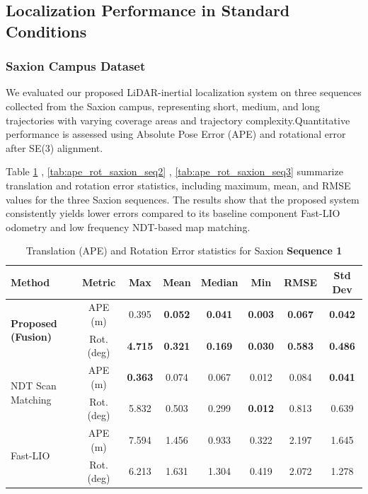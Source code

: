 \subsection{ Localization Performance in Standard Conditions}

\subsubsection{Saxion Campus Dataset}
We evaluated our proposed LiDAR-inertial localization system on three sequences collected from the Saxion campus, representing short, medium, and long trajectories with varying coverage areas and trajectory complexity.Quantitative performance is assessed using Absolute Pose Error (APE) and rotational error after SE(3) alignment.

 Table \ref{tab:ape_rot_saxion_seq1} , \ref{tab:ape_rot_saxion_seq2} , \ref{tab:ape_rot_saxion_seq3} summarize translation and rotation error statistics, including maximum, mean, and RMSE values for the three Saxion sequences. The results show that the proposed system consistently yields lower errors compared to its baseline component Fast-LIO odometry and low frequency NDT-based map matching. 



\begin{table}[H]
	\centering
	\renewcommand{\arraystretch}{0.6}
	\setlength{\tabcolsep}{15pt}
	\caption{Translation (APE) and Rotation Error statistics for Saxion \textbf{Sequence 1} }
	\label{tab:ape_rot_saxion_seq1}
	
	\begin{adjustbox}{width=\textwidth}
		\begin{tabular}{@{}lccccccc@{}}
			\toprule
			\textbf{Method} & \textbf{Metric} & \textbf{Max} & \textbf{Mean} & \textbf{Median} & \textbf{Min} & \textbf{RMSE} & \textbf{Std Dev} \\
			\midrule
			
			\multirow{2}{*}{\textbf{Proposed (Fusion)}} 
			& APE (m)        & 0.395   & \textbf{0.052 }   & \textbf{0.041}     & \textbf{0.003 }   &\textbf{ 0.067}   & \textbf{0.042 }\\
			& Rot. (deg)     & \textbf{4.715}   & \textbf{0.321}    & \textbf{0.169}     &\textbf{ 0.030 }   & \textbf{0.583}   &\textbf{ 0.486} \\
			\midrule
			
			\multirow{2}{*}{NDT Scan Matching} 
			& APE (m)        & \textbf{0.363 }  & 0.074    & 0.067     & 0.012    & 0.084   & \textbf{0.041} \\
			& Rot. (deg)     & 5.832   & 0.503    & 0.299     &\textbf{ 0.012}    & 0.813   & 0.639 \\
			\midrule
			
			\multirow{2}{*}{Fast-LIO} 
			& APE (m)        & 7.594   & 1.456    & 0.933     & 0.322    & 2.197   & 1.645 \\
			& Rot. (deg)     & 6.213   & 1.631    & 1.304     & 0.419    & 2.072   & 1.278 \\
			\bottomrule
		\end{tabular}
	\end{adjustbox}
\end{table}


